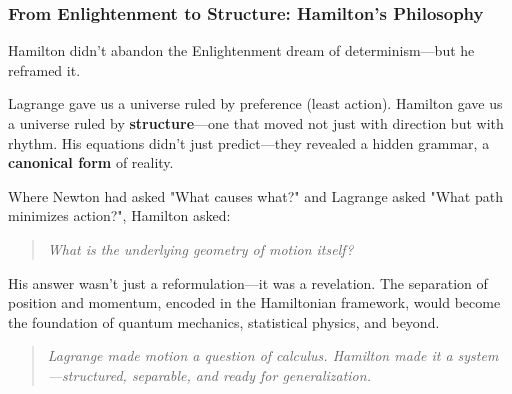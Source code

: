 \vspace{1em}
\subsubsection*{From Enlightenment to Structure: Hamilton’s Philosophy}

Hamilton didn’t abandon the Enlightenment dream of determinism—but he reframed it.

Lagrange gave us a universe ruled by preference (least action). Hamilton gave us a universe ruled by \textbf{structure}—one that moved not just with direction but with rhythm. His equations didn’t just predict—they revealed a hidden grammar, a \textbf{canonical form} of reality.

Where Newton had asked "What causes what?" and Lagrange asked "What path minimizes action?", Hamilton asked:
\begin{quote}
    \emph{What is the underlying geometry of motion itself?}
\end{quote}

His answer wasn’t just a reformulation—it was a revelation. The separation of position and momentum, encoded in the Hamiltonian framework, would become the foundation of quantum mechanics, statistical physics, and beyond.

\begin{quote}
\textit{Lagrange made motion a question of calculus.  
Hamilton made it a system—structured, separable, and ready for generalization.}
\end{quote}

